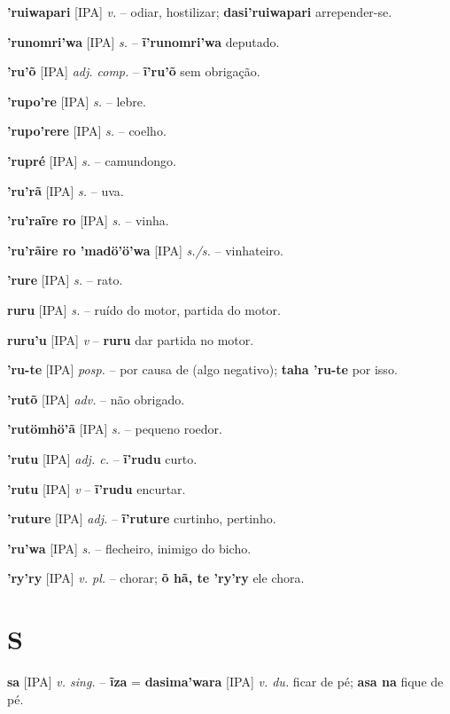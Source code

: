 \textbf{'ruiwapari} [IPA] \textit{v.} -- odiar, hostilizar; \textbf{dasi'ruiwapari} arrepender-se.

\textbf{'runomri'wa} [IPA] \textit{s.} -- \textbf{ĩ'runomri'wa} deputado.

\textbf{'ru'õ} [IPA] \textit{adj. comp.} -- \textbf{ĩ'ru'õ} sem obrigação.

\textbf{'rupo're} [IPA] \textit{s.} -- lebre.

\textbf{'rupo'rere} [IPA] \textit{s.} -- coelho.

\textbf{'rupré} [IPA] \textit{s.} -- camundongo.

\textbf{'ru'rã} [IPA] \textit{s.} -- uva.

\textbf{'ru'raĩre ro} [IPA] \textit{s.} -- vinha.

\textbf{'ru'rãire ro 'madö'ö'wa} [IPA] \textit{s./s.} -- vinhateiro.

\textbf{'rure} [IPA] \textit{s.} -- rato.

\textbf{ruru} [IPA] \textit{s.} -- ruído do motor, partida do motor.

\textbf{ruru'u} [IPA] \textit{v} -- \textbf{ruru} dar partida no motor.

\textbf{'ru-te} [IPA] \textit{posp.} -- por causa de (algo negativo); \textbf{taha 'ru-te} por isso.

\textbf{'rutõ} [IPA] \textit{adv.} -- não obrigado.

\textbf{'rutömhö'ã} [IPA] \textit{s.} -- pequeno roedor.

\textbf{'rutu} [IPA] \textit{adj. c.} -- \textbf{ĩ'rudu} curto.

\textbf{'rutu} [IPA] \textit{v} -- \textbf{ĩ'rudu} encurtar.

\textbf{'ruture} [IPA] \textit{adj.} -- \textbf{ĩ'ruture} curtinho, pertinho.

\textbf{'ru'wa} [IPA] \textit{s.} -- flecheiro, inimigo do bicho.

\textbf{'ry'ry} [IPA] \textit{v. pl.} -- chorar; \textbf{õ hã, te 'ry'ry} ele chora.



\section*{S}

\textbf{sa} [IPA] \textit{v. sing.} -- \textbf{ĩza} = \textbf{dasima'wara} [IPA] \textit{v. du.} ficar de pé; \textbf{asa na} fique de pé.


